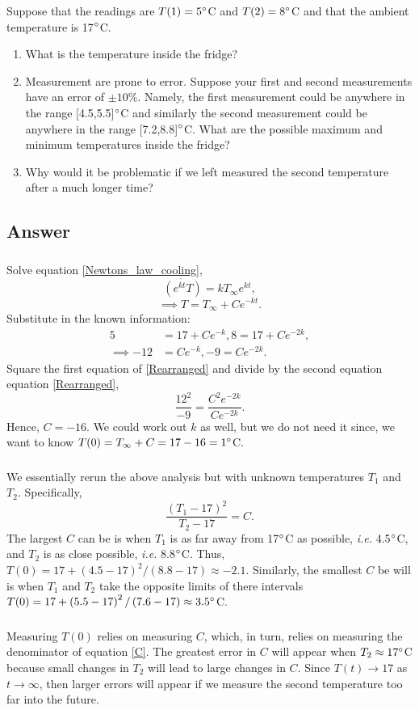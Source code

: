 \documentclass[10pt]{article}
\newcommand{\bb}{\begin{equation}}
\newcommand{\ee}{\end{equation}}
\newcommand{\eqn}[1]{equation \eqref{#1}}
\newcommand{\ie}{\emph{i.e.} }
\renewcommand{\l}{\left(}
\renewcommand{\r}{\right)}
\begin{document}
Suppose that the readings are $T(1) = 5\degree$C and $T(2)=8\degree$C and that the ambient temperature is 17$\degree$C.

\begin{enumerate}
\item What is the temperature inside the fridge?
\item Measurement are prone to error. Suppose your first and second measurements have an error of $\pm10\%$. Namely, the first measurement could be anywhere in the range [4.5,5.5]$\degree$C and similarly the second measurement could be anywhere in the range [7.2,8.8]$\degree$C. What are the possible maximum and minimum temperatures inside the fridge?
\item Why would it be problematic if we left measured the second temperature after a much longer time?
\end{enumerate}
\begin{Answ}
\subsection{Answer}
\subsubsection{}
Solve \eqn{Newtons_law_cooling},
\bb
\dot{\l e^{kt}T\r}=kT_\infty e^{kt},
\ee
\bb
\implies T=T_\infty+Ce^{-kt}.
\ee
Substitute in the known information:
\begin{align}
5&=17 +Ce^{-k},8=17+Ce^{-2k},\\
\implies -12&= Ce^{-k},-9=Ce^{-2k}.\label{Rearranged}
\end{align}
Square the first equation of \eqref{Rearranged} and divide by the second equation \eqn{Rearranged},
\bb
\frac{12^2}{-9}=\frac{C^2e^{-2k}}{Ce^{-2k}}.
\ee
Hence, $C=-16$. We could work out $k$ as well, but we do not need it since, we want to know $T(0)=T_\infty+C=17-16=1\degree$C.

\subsubsection{}
We essentially rerun the above analysis but with unknown temperatures $T_1$ and $T_2$. Specifically,
\bb
\frac{\l T_1-17\r^2}{T_2-17}=C.\label{C}
\ee
The largest $C$ can be is when $T_1$ is as far away from 17$\degree$C as possible, \ie 4.5$\degree$C, and $T_2$ is as close possible, \ie 8.8$\degree$C. Thus, $T(0)=17+\l 4.5-17\r^2/\l 8.8-17\r\approx-2.1$. Similarly, the smallest $C$ be will is when $T_1$ and $T_2$ take the opposite limits of there intervals $T(0)=17+\l 5.5-17\r^2/\l 7.6-17\r\approx3.5\degree$C.
\subsubsection{}
Measuring $T(0)$ relies on measuring $C$, which, in turn, relies on measuring the denominator of \eqn{C}. The greatest error in $C$ will appear when $T_2\approx17\degree$C because small changes in $T_2$ will lead to large changes in $C$. Since $T(t)\rightarrow 17$ as $t\rightarrow\infty$, then larger errors will appear if we measure the second temperature too far into the future.
\end{Answ}
\end{document}
